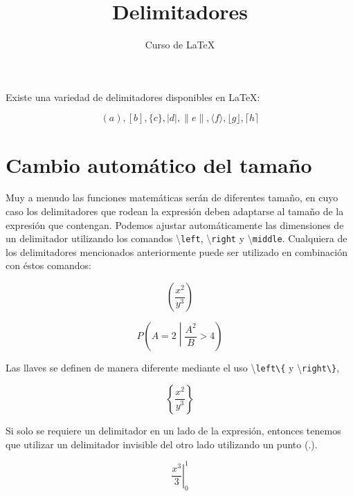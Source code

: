 \documentclass[12pt,letterpaper]{article}
\author{Curso de \LaTeX}
\title{Delimitadores}
\begin{document}
\maketitle

Existe una variedad de delimitadores disponibles en \LaTeX:

\begin{displaymath}
( a ), [ b ], \{ c \}, | d |, \| e \|,
\langle f \rangle, \lfloor g \rfloor,
\lceil h \rceil
\end{displaymath}

\section{Cambio automático del tamaño}

Muy a menudo las funciones matemáticas serán de diferentes tamaño, en cuyo caso los delimitadores que rodean la expresión deben adaptarse al tamaño de la expresión que contengan. Podemos ajustar automáticamente las dimensiones de un delimitador utilizando los comandos \textbackslash\texttt{left}, \textbackslash\texttt{right} y \textbackslash\texttt{middle}. Cualquiera de los delimitadores mencionados anteriormente puede ser utilizado en combinación con éstos comandos:

\begin{displaymath}
\left(\frac{x^2}{y^3}\right) %
\end{displaymath}

\begin{displaymath}
P\left(A=2\middle|\frac{A^2}{B}>4\right) %
\end{displaymath}

Las llaves se definen de manera diferente mediante el uso \textbackslash \texttt{left\textbackslash\{} y \textbackslash \texttt{right\textbackslash\}},

\begin{displaymath}
\left\{\frac{x^2}{y^3}\right\}
\end{displaymath}

Si solo se requiere un delimitador en un lado de la expresión, entonces tenemos que utilizar un delimitador invisible del otro lado utilizando un punto (.).

\begin{displaymath}
\left.\frac{x^3}{3}\right|_0^1
\end{displaymath}
\end{document}
